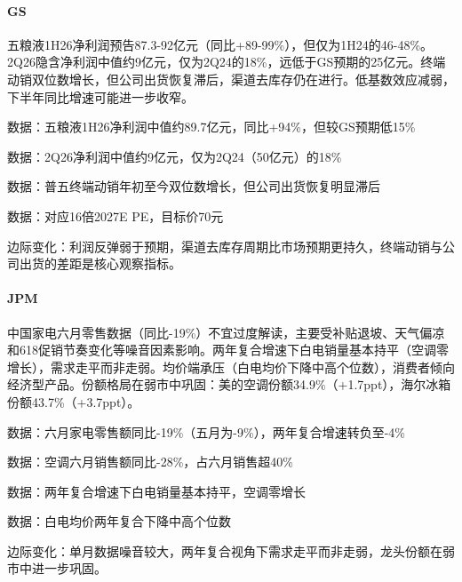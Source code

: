 \documentclass[11pt]{ctexart}
\begin{document}
\paragraph{GS} 五粮液1H26净利润预告87.3-92亿元（同比+89-99\%），但仅为1H24的46-48\%。2Q26隐含净利润中值约9亿元，仅为2Q24的18\%，远低于GS预期的25亿元。终端动销双位数增长，但公司出货恢复滞后，渠道去库存仍在进行。低基数效应减弱，下半年同比增速可能进一步收窄。
{\small\color{refgray}数据：五粮液1H26净利润中值约89.7亿元，同比+94\%，但较GS预期低15\%\par}
{\small\color{refgray}数据：2Q26净利润中值约9亿元，仅为2Q24（50亿元）的18\%\par}
{\small\color{refgray}数据：普五终端动销年初至今双位数增长，但公司出货恢复明显滞后\par}
{\small\color{refgray}数据：对应16倍2027E PE，目标价70元\par}
{\small\color{refgray}边际变化：利润反弹弱于预期，渠道去库存周期比市场预期更持久，终端动销与公司出货的差距是核心观察指标。\par}
\paragraph{JPM} 中国家电六月零售数据（同比-19\%）不宜过度解读，主要受补贴退坡、天气偏凉和618促销节奏变化等噪音因素影响。两年复合增速下白电销量基本持平（空调零增长），需求走平而非走弱。均价端承压（白电均价下降中高个位数），消费者倾向经济型产品。份额格局在弱市中巩固：美的空调份额34.9\%（+1.7ppt），海尔冰箱份额43.7\%（+3.7ppt）。
{\small\color{refgray}数据：六月家电零售额同比-19\%（五月为-9\%），两年复合增速转负至-4\%\par}
{\small\color{refgray}数据：空调六月销售额同比-28\%，占六月销售超40\%\par}
{\small\color{refgray}数据：两年复合增速下白电销量基本持平，空调零增长\par}
{\small\color{refgray}数据：白电均价两年复合下降中高个位数\par}
{\small\color{refgray}边际变化：单月数据噪音较大，两年复合视角下需求走平而非走弱，龙头份额在弱市中进一步巩固。\par}
\end{document}
